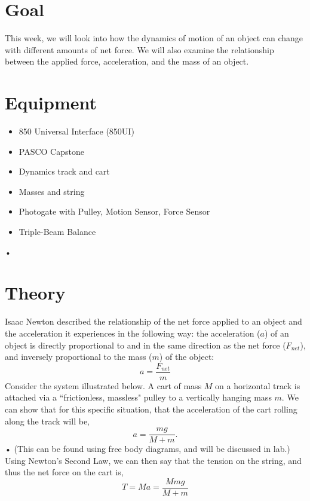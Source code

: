 \documentclass[main.tex]{subfiles}
\begin{document}
\label{chap:Force}

\section*{Goal}
This week, we will look into how the dynamics of motion of an object can change with different amounts of net force. We will also examine the relationship between the applied force, acceleration, and the mass of an object.

\section*{Equipment}
\begin{itemize}
\item
850 Universal Interface (850UI)
\item
PASCO Capstone
\item
Dynamics track and cart
\item
Masses and string
\item
Photogate with Pulley, Motion Sensor, Force Sensor
\item
Triple-Beam Balance
\end{itemize}•

\section*{Theory}
Isaac Newton described the relationship of the net force applied to an object and the acceleration it experiences in the following way: the acceleration ($a$) of an object is directly proportional to and in the same direction as the net force ($F_{net}$), and inversely proportional to the mass ($m$) of the object:
\begin{equation} \label{eq:Law2}
a=\frac{F_{net}}{m}
\end{equation}
Consider the system illustrated below. A cart of mass $M$ on a horizontal track is attached via a ``frictionless, massless" pulley to a vertically hanging mass $m.$ We can show that for this specific situation, that the acceleration of the cart rolling along the track will be,
\begin{equation} \label{eq:acc_cart}
a=\frac{mg}{M+m}.
\end{equation}•
(This can be found using free body diagrams, and will be discussed in lab.) Using Newton's Second Law, we can then say that the tension on the string, and thus the net force on the cart is,
\begin{equation} \label{eq:F_cart}
T=Ma=\frac{Mmg}{M+m}
\end{equation}
\end{document}
